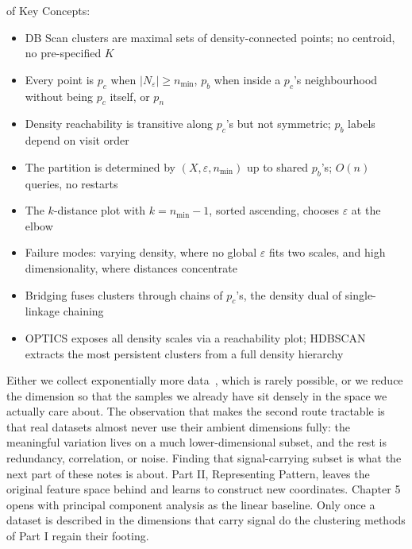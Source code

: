  of Key Concepts:
\begin{itemize}
    \item DB Scan clusters are maximal sets of density-connected points; no centroid, no pre-specified $K$
    \item Every point is $p_c$ when $|N_\varepsilon| \geq n_{\min}$, $p_b$ when inside a $p_c$'s neighbourhood without being $p_c$ itself, or $p_n$
    \item Density reachability is transitive along $p_c$'s but not symmetric; $p_b$ labels depend on visit order
    \item The partition is determined by $(X, \varepsilon, n_{\min})$ up to shared $p_b$'s; $O(n)$ queries, no restarts
    \item The $k$-distance plot with $k{=}n_{\min}{-}1$, sorted ascending, chooses $\varepsilon$ at the elbow
    \item Failure modes: varying density, where no global $\varepsilon$ fits two scales, and high dimensionality, where distances concentrate
    \item Bridging fuses clusters through chains of $p_c$'s, the density dual of single-linkage chaining
    \item OPTICS exposes all density scales via a reachability plot; HDBSCAN extracts the most persistent clusters from a full density hierarchy
\end{itemize}

 Either we collect exponentially more data~\cite{Halevy2009}, which is rarely possible, or we reduce the dimension so that the samples we already have sit densely in the space we actually care about.
The observation that makes the second route tractable is that real datasets almost never use their ambient dimensions fully: the meaningful variation lives on a much lower-dimensional subset, and the rest is redundancy, correlation, or noise.
Finding that signal-carrying subset is what the next part of these notes is about.
 Part II, Representing Pattern, leaves the original feature space behind and learns to construct new coordinates.
Chapter 5 opens with principal component analysis as the linear baseline.
Only once a dataset is described in the dimensions that carry signal do the clustering methods of Part I regain their footing.

